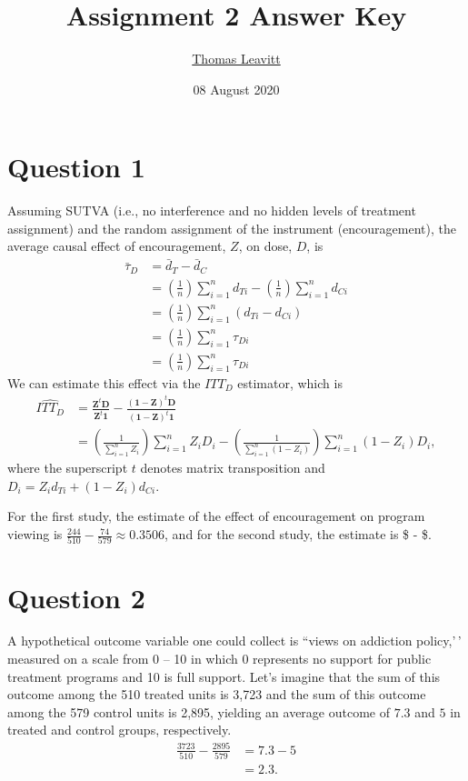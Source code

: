 \documentclass[
  12pt,
  leqno]{article}
\title{Assignment 2 Answer Key}
\author{\href{mailto:tl2624@columbia.edu}{Thomas Leavitt}}
\date{08 August 2020}
\DeclareMathOperator{\1}{\mathbbm{1}}
\begin{document}
\maketitle

\section*{Question 1}

Assuming SUTVA (i.e., no interference and no hidden levels of treatment
assignment) and the random assignment of the instrument (encouragement),
the average causal effect of encouragement, \(Z\), on dose, \(D\), is
\begin{align*}
\bar{\tau}_D & = \bar{d}_T - \bar{d}_C \\
& = \left(\frac{1}{n}\right) \sum \limits_{i = 1}^n d_{Ti} - \left(\frac{1}{n}\right) \sum \limits_{i = 1}^nd_{Ci} \\ 
& = \left(\frac{1}{n}\right) \sum \limits_{i = 1}^n \left(d_{Ti} - d_{Ci}\right) \\ 
& = \left(\frac{1}{n}\right) \sum \limits_{i = 1}^n \tau_{Di} \\
& = \left(\frac{1}{n}\right) \sum \limits_{i = 1}^n \tau_{Di}
\end{align*} We can estimate this effect via the \(ITT_D\) estimator,
which is \begin{align*}
\widehat{ITT_D} & = \frac{\mathbf{Z}^{t}\mathbf{D}}{\mathbf{Z}^{t}\mathbf{1}} - \frac{\left(\mathbf{1} - \mathbf{Z}\right)^{t}\mathbf{D}}{\left(\mathbf{1} - \mathbf{Z}\right)^{t}\mathbf{1}} \\ 
& = \left(\frac{1}{\sum_{i = 1}^n Z_i}\right) \sum_{i = 1}^n Z_i D_i - \left(\frac{1}{\sum_{i = 1}^n \left(1 - Z_i\right)}\right) \sum_{i = 1}^n \left(1 - Z_i\right) D_i,
\end{align*} where the superscript \(t\) denotes matrix transposition
and \(D_i = Z_i d_{Ti} + \left(1 - Z_i\right) d_{Ci}\).

For the first study, the estimate of the effect of encouragement on
program viewing is \(\frac{244}{510} - \frac{74}{579} \approx 0.3506\),
and for the second study, the estimate is \$  -
 \$.

\section*{Question 2}

A hypothetical outcome variable one could collect is ``views on
addiction policy,'\,' measured on a scale from 0 -- 10 in which 0
represents no support for public treatment programs and 10 is full
support. Let's imagine that the sum of this outcome among the 510
treated units is 3,723 and the sum of this outcome among the 579 control
units is 2,895, yielding an average outcome of \(7.3\) and \(5\) in
treated and control groups, respectively. \begin{align*}
\frac{3723}{510} - \frac{2895}{579} & = 7.3 - 5 \\
& = 2.3.
\end{align*}
\end{document}
